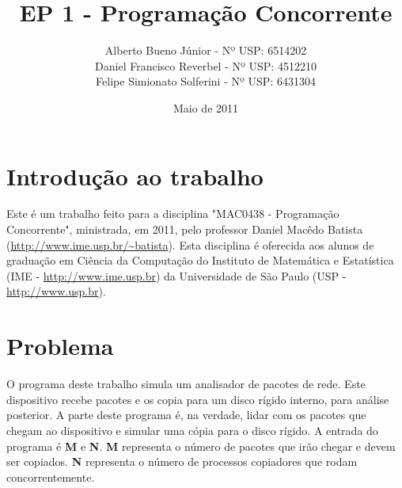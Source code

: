 \documentclass[12pt,a4paper]{article}
\title{EP 1 - Programação Concorrente}
\author{Alberto Bueno Júnior - Nº USP: 6514202\\Daniel Francisco Reverbel - Nº USP: 4512210\\Felipe Simionato Solferini - Nº USP: 6431304}
\date{Maio de 2011}
\begin{document}
\maketitle
\pagebreak
\tableofcontents
\pagebreak

\section{Introdução ao trabalho}
Este é um trabalho feito para a disciplina "MAC0438 - Programação Concorrente", ministrada, em 2011, pelo professor Daniel Macêdo Batista (\url{http://www.ime.usp.br/~batista}). 
Esta disciplina é oferecida aos alunos de graduação em Ciência da Computação do Instituto de Matemática e Estatística (IME - \url{http://www.ime.usp.br}) da Universidade de São Paulo (USP - \url{http://www.usp.br}).

\section{Problema}
O programa deste trabalho simula um analisador de pacotes de rede. Este dispositivo recebe pacotes e os copia para um disco rígido interno, para análise posterior. A parte deste programa é, na verdade, lidar com os pacotes que chegam ao dispositivo e simular uma cópia para o disco rígido. A entrada do programa é \textbf{M} e \textbf{N}. \textbf{M} representa o número de pacotes que irão chegar e devem ser copiados. \textbf{N} representa o número de processos copiadores que rodam concorrentemente.

\pagebreak
\end{document}
